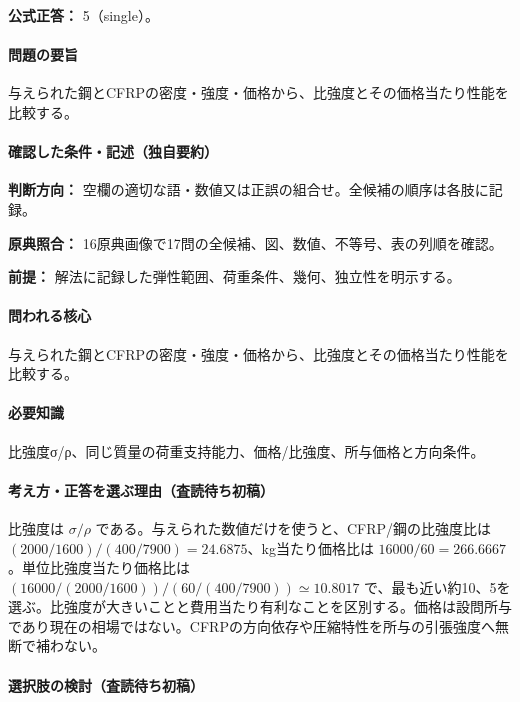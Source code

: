 \textbf{公式正答：} 5（single）。

\paragraph{問題の要旨} 与えられた鋼とCFRPの密度・強度・価格から、比強度とその価格当たり性能を比較する。

\paragraph{確認した条件・記述（独自要約）}\mbox{}\par

\noindent\textbf{判断方向：} 空欄の適切な語・数値又は正誤の組合せ。全候補の順序は各肢に記録。\par

\noindent\textbf{原典照合：} 16原典画像で17問の全候補、図、数値、不等号、表の列順を確認。\par

\noindent\textbf{前提：} 解法に記録した弾性範囲、荷重条件、幾何、独立性を明示する。\par

\paragraph{問われる核心} 与えられた鋼とCFRPの密度・強度・価格から、比強度とその価格当たり性能を比較する。

\paragraph{必要知識} 比強度σ/ρ、同じ質量の荷重支持能力、価格/比強度、所与価格と方向条件。

\paragraph{考え方・正答を選ぶ理由（査読待ち初稿）} 比強度は \(\sigma/\rho\) である。与えられた数値だけを使うと、CFRP/鋼の比強度比は \((2000/1600)/(400/7900)=24.6875\)、kg当たり価格比は \(16000/60=266.6667\)。単位比強度当たり価格比は \((16000/(2000/1600))/(60/(400/7900))\simeq10.8017\) で、最も近い約10、5を選ぶ。比強度が大きいことと費用当たり有利なことを区別する。価格は設問所与であり現在の相場ではない。CFRPの方向依存や圧縮特性を所与の引張強度へ無断で補わない。

\paragraph{選択肢の検討（査読待ち初稿）}\mbox{}\par

